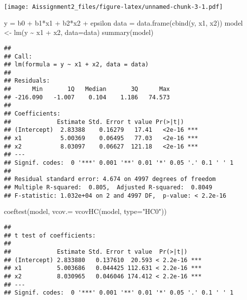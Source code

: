 \documentclass[
]{article}
\newenvironment{Shaded}{\begin{snugshade}}{\end{snugshade}}
\newcommand{\AttributeTok}[1]{\textcolor[rgb]{0.77,0.63,0.00}{#1}}
\newcommand{\FunctionTok}[1]{\textcolor[rgb]{0.00,0.00,0.00}{#1}}
\newcommand{\NormalTok}[1]{#1}
\newcommand{\OtherTok}[1]{\textcolor[rgb]{0.56,0.35,0.01}{#1}}
\newcommand{\SpecialCharTok}[1]{\textcolor[rgb]{0.00,0.00,0.00}{#1}}
\newcommand{\StringTok}[1]{\textcolor[rgb]{0.31,0.60,0.02}{#1}}
\begin{document}
\texttt{[image: Aissignment2\_files/figure-latex/unnamed-chunk-3-1.pdf]}

\begin{Shaded}
\begin{Highlighting}[]
\NormalTok{y }\OtherTok{=}\NormalTok{ b0 }\SpecialCharTok{+}\NormalTok{ b1}\SpecialCharTok{*}\NormalTok{x1 }\SpecialCharTok{+}\NormalTok{ b2}\SpecialCharTok{*}\NormalTok{x2 }\SpecialCharTok{+}\NormalTok{ epsilon}
\NormalTok{data }\OtherTok{=} \FunctionTok{data.frame}\NormalTok{(}\FunctionTok{cbind}\NormalTok{(y, x1, x2))}
\NormalTok{model }\OtherTok{\textless{}{-}} \FunctionTok{lm}\NormalTok{(y }\SpecialCharTok{\textasciitilde{}}\NormalTok{ x1 }\SpecialCharTok{+}\NormalTok{ x2, }\AttributeTok{data=}\NormalTok{data)}
\FunctionTok{summary}\NormalTok{(model)}
\end{Highlighting}
\end{Shaded}

\begin{verbatim}
## 
## Call:
## lm(formula = y ~ x1 + x2, data = data)
## 
## Residuals:
##      Min       1Q   Median       3Q      Max 
## -216.090   -1.007    0.104    1.186   74.573 
## 
## Coefficients:
##             Estimate Std. Error t value Pr(>|t|)    
## (Intercept)  2.83388    0.16279   17.41   <2e-16 ***
## x1           5.00369    0.06495   77.03   <2e-16 ***
## x2           8.03097    0.06627  121.18   <2e-16 ***
## ---
## Signif. codes:  0 '***' 0.001 '**' 0.01 '*' 0.05 '.' 0.1 ' ' 1
## 
## Residual standard error: 4.674 on 4997 degrees of freedom
## Multiple R-squared:  0.805,  Adjusted R-squared:  0.8049 
## F-statistic: 1.032e+04 on 2 and 4997 DF,  p-value: < 2.2e-16
\end{verbatim}

\begin{Shaded}
\begin{Highlighting}[]
\FunctionTok{coeftest}\NormalTok{(model, }\AttributeTok{vcov.=} \FunctionTok{vcovHC}\NormalTok{(model, }\AttributeTok{type=}\StringTok{"HC0"}\NormalTok{))}
\end{Highlighting}
\end{Shaded}

\begin{verbatim}
## 
## t test of coefficients:
## 
##             Estimate Std. Error t value  Pr(>|t|)    
## (Intercept) 2.833880   0.137610  20.593 < 2.2e-16 ***
## x1          5.003686   0.044425 112.631 < 2.2e-16 ***
## x2          8.030965   0.046046 174.412 < 2.2e-16 ***
## ---
## Signif. codes:  0 '***' 0.001 '**' 0.01 '*' 0.05 '.' 0.1 ' ' 1
\end{verbatim}
\end{document}
